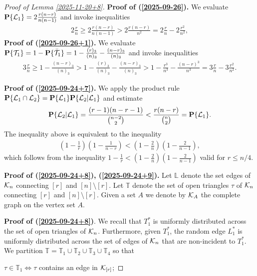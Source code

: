 \documentclass[11pt, a4paper]{article}
\newcommand{\PP}{{\bf{P}}}
\begin{document}
\begin{proof}[Proof of Lemma \ref{2025-11-20+8}]
{\bf Proof of (\ref{2025-09-26}).}
%
 We  evaluate $\PP\{{\cal L}_1\}
 =
2\frac{r(n-r)}{n(n-1)}$ and invoke inequalities
 \begin{align*}
2\frac{r}{n} \ge 
2\frac{r(n-r)}{n(n-1)}
> 
2\frac{r(n-r)}{n^2}
 =
 2\frac{r}{n}-2\frac{r^2}{n^2},
 \end{align*}
{\bf Proof of  (\ref{2025-09-26+1}).}
We evaluate $\PP\{{\cal T}_1\}
 =
 1
 -
  \PP\{{\bar {\cal T}}_1\}
 =
 1
 -
 \frac{(r)_3}{(n)_3}
 -
 \frac{(n-r)_3}{(n)_3}$
 and invoke inequalities
  \begin{align*}
3\frac{r}{n}
\ge
 1
 -
 \frac{(n-r)_3}{(n)_3}
 >
 1
 -
 \frac{(r)_3}{(n)_3}
 -
 \frac{(n-r)_3}{(n)_3}
 > 
 1
 -
 \frac{r^3}{n^3}
 -
 \frac{(n-r)^3}{n^3}
 =
 3\frac{r}{n}-3\frac{r^2}{n^2}.
 \end{align*}

{\bf Proof of (\ref{2025-09-24+7}).}
We apply the product rule
$\PP\{{\cal L}_1\cap {\cal L}_2\}
 =
 \PP\{{\cal L}_1\}\PP\{{\cal L}_2|{\cal L}_1\}$
and estimate 
\begin{align*}
\PP\{{\cal L}_2|{\cal L}_1\}
= 
 \frac{(r-1)(n-r-1)}{\binom{n-2}{2}}
< 
\frac{r(n-r)}{\binom{n}{2}}
= 
\PP\{{\cal L}_1\}.
\end{align*}
The inequality above is equivalent to the inequality
\begin{align*}
\left(1-\frac{1}{r}\right)
\left(1-\frac{1}{n-r}\right)
<
\left(1-\frac{2}{n}\right)
\left(1-\frac{2}{n-1}\right),
\end{align*}
which follows from the inequality $1-\frac{1}{r}<\left(1-\frac{2}{n}\right)\left(1-\frac{2}{n-1}\right)$ valid for $r\le n/4$.

{\bf Proof of (\ref{2025-09-24+8}),
 (\ref{2025-09-24+9}).}
  Let ${\mathbb L}$ denote the set edges  of 
 ${\cal K}_n$
 connecting $[r]$ and $[n]\setminus[r]$.  Let ${\mathbb T}$ denote the set of open triangles $\tau$ of 
 ${\cal K}_n$
 connecting $[r]$ and $[n]\setminus[r]$. 
  Given a set $A$ we denote by ${\cal K}_A$ the 
 complete graph on the vertex set $A$.


 
 
{\bf Proof of (\ref{2025-09-24+8})}. 
We recall that $T_1^*$ is uniformly distributed across the 
set of open triangles of ${\cal K}_n$. Furthermore, given 
$T_1^*$, the random edge $L_1^*$ is uniformly distributed 
across the set of edges of ${\cal K}_n$ that are 
non-incident to $T_1^*$.
We partition 
 ${\mathbb T}
 =
 {\mathbb T}_1\cup{\mathbb T}_2
 \cup
 {\mathbb T}_3\cup{\mathbb T}_4$ so that

 $\tau\in {\mathbb T}_1\Leftrightarrow \tau$ contains an 
 edge in ${\cal K}_{[r]}$;
 

\end{proof}
\end{document}
